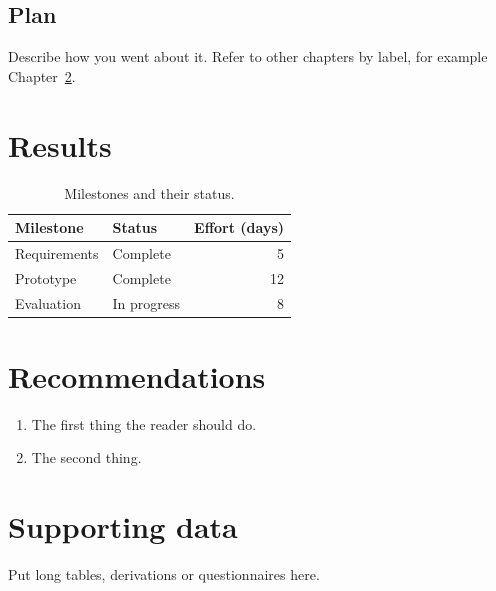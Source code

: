 \documentclass[11pt,a4paper]{report}
\begin{document}
\section{Plan}
Describe how you went about it. Refer to other chapters by label, for
example Chapter~\ref{ch:results}.

\chapter{Results}
\label{ch:results}
\begin{table}[htbp]
  \centering
  \caption{Milestones and their status.}
  \begin{tabular}{llr}
    \toprule
    Milestone        & Status      & Effort (days) \\
    \midrule
    Requirements     & Complete    & 5 \\
    Prototype        & Complete    & 12 \\
    Evaluation       & In progress & 8 \\
    \bottomrule
  \end{tabular}
\end{table}

\chapter{Recommendations}
\begin{enumerate}
  \item The first thing the reader should do.
  \item The second thing.
\end{enumerate}

\appendix
\chapter{Supporting data}
Put long tables, derivations or questionnaires here.

\printbibliography[heading=bibintoc]
\end{document}
